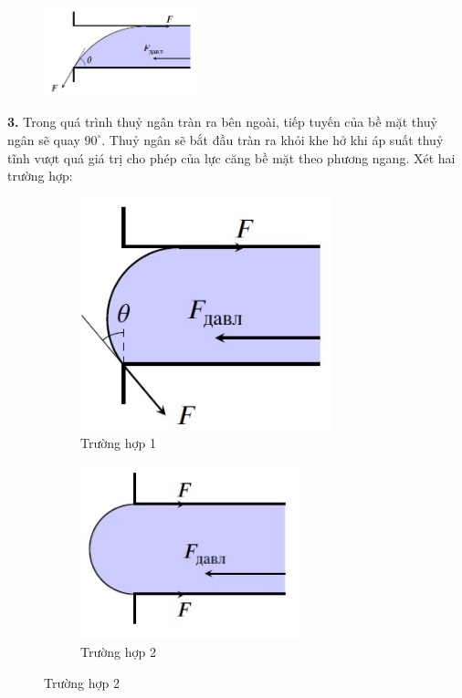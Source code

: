 \begin{figure}[h]
  \centering
  \includegraphics[width=0.4\textwidth]{Figures/Fig 2S2.jpg}
\end{figure}

\noindent\textbf{3.} Trong quá trình thuỷ ngân tràn ra bên ngoài, tiếp tuyến của bề mặt thuỷ ngân sẽ quay $90^{\circ}$. Thuỷ ngân sẽ bắt đầu tràn ra khỏi khe hở khi áp suất thuỷ tĩnh vượt quá giá trị cho phép của lực căng bề mặt theo phương ngang. Xét hai trường hợp:
\begin{figure}[h]
  \centering
  \begin{subfigure}[b]{0.49\textwidth}
    \centering
    \includegraphics[width=0.8\textwidth]{Figures/Fig 2S3.jpg}
    \caption{Trường hợp 1}
  \end{subfigure}
  \hfill
  \begin{subfigure}[b]{0.49\textwidth}
    \centering
    \includegraphics[width=0.7\textwidth]{Figures/Fig 2S4.jpg}
    \caption{Trường hợp 2}
  \end{subfigure}
\end{figure}

